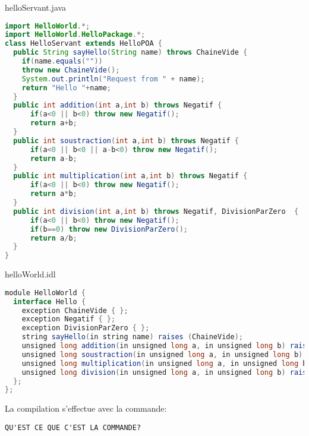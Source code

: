 \documentclass{article}
\begin{document}
helloServant.java
\begin{lstlisting}[language=JAVA]
import HelloWorld.*;
import HelloWorld.HelloPackage.*;
class HelloServant extends HelloPOA {
  public String sayHello(String name) throws ChaineVide {
    if(name.equals(""))
	throw new ChaineVide();
    System.out.println("Request from " + name);
    return "Hello "+name;
  }
  public int addition(int a,int b) throws Negatif {
	  if(a<0 || b<0) throw new Negatif();
	  return a+b;
  }  
  public int soustraction(int a,int b) throws Negatif {
	  if(a<0 || b<0 || a-b<0) throw new Negatif();
	  return a-b;
  }  
  public int multiplication(int a,int b) throws Negatif {
	  if(a<0 || b<0) throw new Negatif();
	  return a*b;
  }  
  public int division(int a,int b) throws Negatif, DivisionParZero  {
	  if(a<0 || b<0) throw new Negatif();
	  if(b==0) throw new DivisionParZero();
	  return a/b;
  }  
}


\end{lstlisting}

helloWorld.idl
\begin{lstlisting}[language=JAVA]
module HelloWorld {
  interface Hello {
    exception ChaineVide { };
    exception Negatif { };
    exception DivisionParZero { };
    string sayHello(in string name) raises (ChaineVide);
    unsigned long addition(in unsigned long a, in unsigned long b) raises (Negatif);
    unsigned long soustraction(in unsigned long a, in unsigned long b) raises (Negatif);
    unsigned long multiplication(in unsigned long a, in unsigned long b) raises (Negatif);
    unsigned long division(in unsigned long a, in unsigned long b) raises (Negatif, DivisionParZero);
  };
};
\end{lstlisting}

La compilation s'effectue avec la commande:
\begin{lstlisting}
QU'EST CE QUE C'EST LA COMMANDE?
\end{lstlisting}
\end{document}

